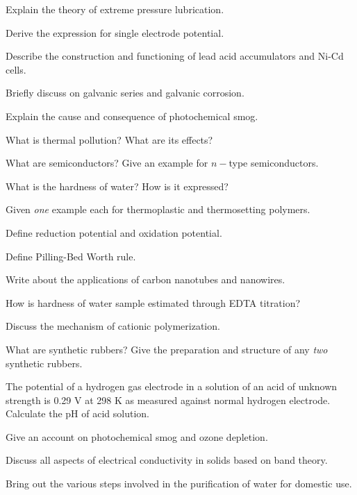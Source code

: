 \item     
  \iitem 
    \iitem Explain the theory of extreme pressure lubrication. 
    \item Derive the expression for single electrode potential. 
    \ene
\Or
\item Describe the construction and functioning of lead acid accumulators and Ni-Cd cells.
\ene

\item
  \iitem Briefly discuss on galvanic series and galvanic corrosion.
\Or
\item
\iitem Explain the cause and consequence of photochemical smog. 
\item What is thermal pollution? What are its effects? 
\ene
\ene

\markC
\ene

\newpage

\sub{\subj}
\maxtime

\partA

\iitem What are semiconductors? Give an example for $n-$type semiconductors.
\item What is the hardness of water? How is it expressed?
\item Given {\em one} example each for thermoplastic and thermosetting polymers.
\item Define reduction potential and oxidation potential.
\item Define Pilling-Bed Worth rule.

\markA
\partB

\item Write about the applications of carbon nanotubes and nanowires.
\item How is hardness of water sample estimated through EDTA titration?
\item Discuss the mechanism of cationic polymerization.
\item What are synthetic rubbers? Give the preparation and structure of any {\em two} synthetic rubbers.
\item The potential of a hydrogen gas electrode in a solution of an acid of unknown strength is 0.29 V at 
  298 K as measured against normal hydrogen electrode. Calculate the pH of acid solution.
\item Give an account on photochemical smog and ozone depletion.

\markB
\partCo

\item \iitem Discuss all aspects of electrical conductivity in solids based on band theory.
\Or
\item Bring out the various steps involved in the purification of water for domestic use.
\ene

